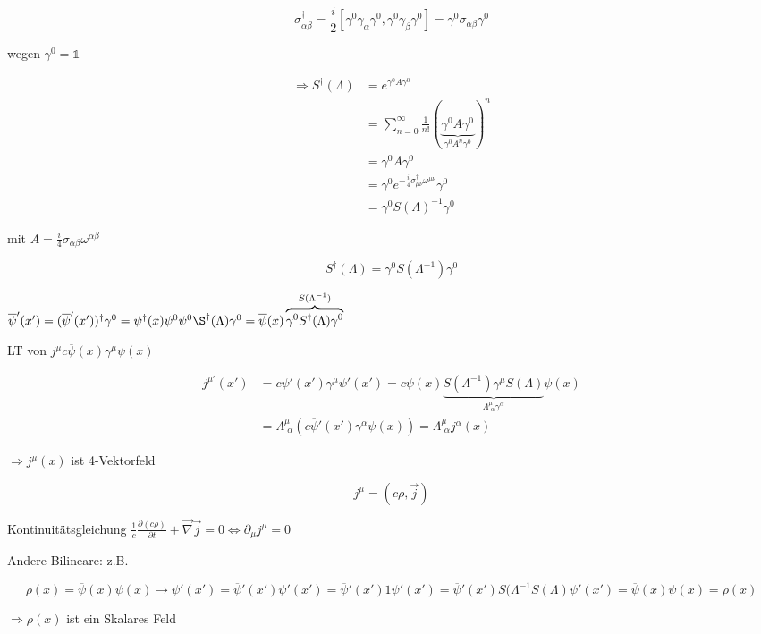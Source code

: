 \[\sigma^\dagger_{\alpha\beta} = \frac{i}{2}[ \gamma^0\gamma_\alpha\gamma^0, \gamma^0\gamma_\beta\gamma^0] = \gamma^0\sigma_{\alpha\beta}\gamma^0\]

wegen \(\gamma^0=\mathbb 1\)


\begin{align}
\Rightarrow  S^\dagger(\Lambda) &= e^{\gamma^0 A\gamma^0}\\
&=\sum_{n=0}^\infty \frac{1}{n!}(\underbrace{\gamma^0 A \gamma^0}_{\gamma^0 A^n \gamma^0})^n \\
&= \gamma^0 A \gamma^0 \\
&= \gamma^0 e^{+\frac{i}{4}\sigma^\dagger_{\mu\nu}\omega^{\mu\nu}}  \gamma^0 \\
&= \gamma^0 S(\Lambda)^{-1}\gamma^0
\end{align}

mit \(A = \frac{i}{4}\sigma_{\alpha\beta}\omega^{\alpha\beta}\)

\[\boxed{S^\dagger (\Lambda) = \gamma^0S(\Lambda^{-1})\gamma^0 }\]

\(\overline\psi'(x') = (\overline\psi'(x'))^\dagger\gamma^0 = \psi^\dagger(x)\psi^0\psi^0\S^\dagger(\Lambda)\gamma^0 =\overline\psi(x)\overbrace{\gamma^0S^\dagger(\Lambda)\gamma^0}^{S(\Lambda^{-1})}  \)

LT von \(j^\mu c\overline\psi(x)\gamma^\mu\psi(x)\)

\begin{align}
j^{\mu'}(x') &= c\overline\psi'(x')\gamma^\mu\psi'(x') = c\overline\psi(x)\underbrace{S(\Lambda^{-1})\gamma^\mu S(\Lambda)}_{\Lambda^\mu_{\,\,\alpha}\gamma^\alpha}\psi(x)\\
&=\Lambda^\mu_{\,\,\alpha}(c\overline\psi'(x')\gamma^\alpha\psi(x)) = \Lambda^\mu_{\,\,\alpha}j^\alpha(x)
\end{align}

\(\Rightarrow j^\mu(x)\) ist 4-Vektorfeld

\[j^\mu = (c\rho,\vec j)\]

Kontinuitätsgleichung \(\frac{1}{c}\frac{\partial(c \rho) }{\partial t} + \vec\nabla\vec j = 0 \Leftrightarrow  \partial_\mu j^\mu = 0 \)

Andere Bilineare: z.B.

\[\rho(x) = \overline \psi(x)\psi(x) \rightarrow \psi'(x') = \overline \psi'(x')\psi'(x') = \overline \psi'(x')\mathcal 1 \psi'(x') = \overline \psi'(x') S(\Lambda^{-1}S(\Lambda) \psi'(x') = \overline \psi(x)\psi(x) = \rho(x) \]

\(\Rightarrow \rho(x)\) ist ein Skalares Feld

